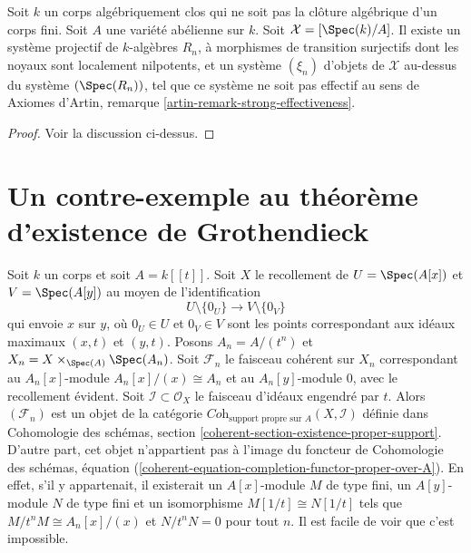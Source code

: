 \begin{lemma}
\label{lemma-non-formal-effectiveness}
Soit $k$ un corps algébriquement clos qui ne soit pas la clôture
algébrique d'un corps fini. Soit $A$ une variété abélienne sur $k$.
Soit $\mathcal{X} = [\Spec(k)/A]$.
Il existe un système projectif de $k$-algèbres $R_n$,
à morphismes de transition surjectifs dont les noyaux sont localement nilpotents,
et un système $(\xi_n)$ d'objets de $\mathcal{X}$ au-dessus du système
$(\Spec(R_n))$, tel que ce système ne soit pas effectif
au sens de Axiomes d'Artin, remarque \ref{artin-remark-strong-effectiveness}.
\end{lemma}

\begin{proof}
Voir la discussion ci-dessus.
\end{proof}








\section{Un contre-exemple au théorème d'existence de Grothendieck}
\label{section-Grothendieck-existence}

\noindent
Soit $k$ un corps et soit $A = k[[t]]$. Soit $X$ le recollement de
$U = \Spec(A[x])$ et $V = \Spec(A[y])$ au moyen de l'identification
$$
U \setminus \{0_U\} \longrightarrow V \setminus \{0_V\}
$$
qui envoie $x$ sur $y$, où $0_U \in U$ et $0_V \in V$ sont les points
correspondant aux idéaux maximaux $(x, t)$ et $(y, t)$. Posons
$A_n = A/(t^n)$ et $X_n = X \times_{\Spec(A)} \Spec(A_n)$.
Soit $\mathcal{F}_n$ le faisceau cohérent sur $X_n$
correspondant au $A_n[x]$-module $A_n[x]/(x) \cong A_n$
et au $A_n[y]$-module $0$, avec le recollement évident.
Soit $\mathcal{I} \subset \mathcal{O}_X$ le faisceau
d'idéaux engendré par $t$. Alors $(\mathcal{F}_n)$ est un objet de
la catégorie $\textit{Coh}_{\text{support propre sur } A}(X, \mathcal{I})$
définie dans
Cohomologie des schémas, section \ref{coherent-section-existence-proper-support}.
D'autre part, cet objet n'appartient pas à l'image du
foncteur
de Cohomologie des schémas,
équation (\ref{coherent-equation-completion-functor-proper-over-A}).
En effet, s'il y appartenait, il existerait un $A[x]$-module $M$ de type fini,
un $A[y]$-module $N$ de type fini et un isomorphisme $M[1/t] \cong N[1/t]$
tels que $M/t^nM \cong A_n[x]/(x)$ et $N/t^nN = 0$ pour tout $n$.
Il est facile de voir que c'est impossible.


